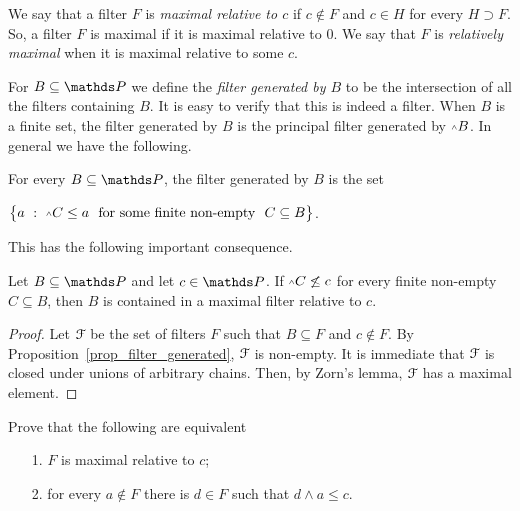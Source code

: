 \documentclass[creche.tex]{subfiles}
\begin{document}
We say that a filter $F$ is \emph{maximal relative to $c$\/} if $c\notin F$ and $c\in H$ for every $H\supset F$. So, a filter $F$ is maximal if it is maximal relative to $0$. We say that  $F$ is \emph{relatively maximal\/} when it is maximal relative to some $c$.

For $B\subseteq\PP$ we define the \emph{filter generated by $B$\/} to be the intersection of all the filters containing $B$. It is easy to verify that this is indeed a filter.  When $B$ is a finite set, the filter generated by $B$ is the principal filter generated by $\swedge B$. In general we have the following.


\begin{proposition} \label{prop_filter_generated}
For every $B\subseteq \PP$, the filter generated by $B$ is the set

\hfill$\big\{a\ :\ \swedge C\le a\ \textrm{ for some finite non-empty }\ C\subseteq B\big\}$.\QED
\end{proposition}

This has the following important consequence.

\begin{proposition}\label{esistenzamassimale2}
Let $B\subseteq \PP$ and let $c\in \PP$. If $\swedge C\not\le c$ for every finite non-empty $C\subseteq B$, then $B$ is contained in a maximal filter relative to $c$.
\end{proposition}

\begin{proof}
Let $\EuScript F$ be the set of filters $F$ such that $B\subseteq F$ and $c\notin F$. By Proposition~\ref{prop_filter_generated}, $\EuScript F$ is non-empty. It is immediate that $\EuScript F$ is closed under unions of arbitrary chains. Then, by Zorn's lemma, $\EuScript F$ has a maximal element.
\end{proof}

\begin{exercise}\label{ex_maximal_equivalent}
Prove that the following are equivalent
\begin{itemize}
\item[1.] $F$ is maximal relative to $c$;
\item[2.] for every $a\notin F$ there is $d\in F$ such that $d\wedge a\le c$.\QED
\end{itemize}
\end{exercise}
\end{document}
